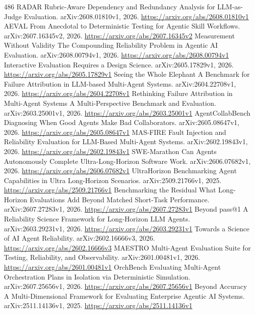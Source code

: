 \documentclass[11pt]{article}
\begin{document}
\begin{thebibliography}{486}
 RADAR Rubric-Aware Dependency and Redundancy Analysis for LLM-as-Judge Evaluation. arXiv:2608.01810v1, 2026. \url{https://arxiv.org/abs/2608.01810v1}
 AEVAL From Anecdotal to Deterministic Testing for Agentic Skill Workflows. arXiv:2607.16345v2, 2026. \url{https://arxiv.org/abs/2607.16345v2}
 Measurement Without Validity The Compounding Reliability Problem in Agentic AI Evaluation. arXiv:2608.00794v1, 2026. \url{https://arxiv.org/abs/2608.00794v1}
 Interactive Evaluation Requires a Design Science. arXiv:2605.17829v1, 2026. \url{https://arxiv.org/abs/2605.17829v1}
 Seeing the Whole Elephant A Benchmark for Failure Attribution in LLM-based Multi-Agent Systems. arXiv:2604.22708v1, 2026. \url{https://arxiv.org/abs/2604.22708v1}
 Rethinking Failure Attribution in Multi-Agent Systems A Multi-Perspective Benchmark and Evaluation. arXiv:2603.25001v1, 2026. \url{https://arxiv.org/abs/2603.25001v1}
 AgentCollabBench Diagnosing When Good Agents Make Bad Collaborators. arXiv:2605.08647v1, 2026. \url{https://arxiv.org/abs/2605.08647v1}
 MAS-FIRE Fault Injection and Reliability Evaluation for LLM-Based Multi-Agent Systems. arXiv:2602.19843v1, 2026. \url{https://arxiv.org/abs/2602.19843v1}
 SWE-Marathon Can Agents Autonomously Complete Ultra-Long-Horizon Software Work. arXiv:2606.07682v1, 2026. \url{https://arxiv.org/abs/2606.07682v1}
 UltraHorizon Benchmarking Agent Capabilities in Ultra Long-Horizon Scenarios. arXiv:2509.21766v1, 2025. \url{https://arxiv.org/abs/2509.21766v1}
 Benchmarking the Residual What Long-Horizon Evaluations Add Beyond Matched Short-Task Performance. arXiv:2607.27283v1, 2026. \url{https://arxiv.org/abs/2607.27283v1}
 Beyond pass@1 A Reliability Science Framework for Long-Horizon LLM Agents. arXiv:2603.29231v1, 2026. \url{https://arxiv.org/abs/2603.29231v1}
 Towards a Science of AI Agent Reliability. arXiv:2602.16666v3, 2026. \url{https://arxiv.org/abs/2602.16666v3}
 MAESTRO Multi-Agent Evaluation Suite for Testing, Reliability, and Observability. arXiv:2601.00481v1, 2026. \url{https://arxiv.org/abs/2601.00481v1}
 OrchBench Evaluating Multi-Agent Orchestration Plans in Isolation via Deterministic Simulation. arXiv:2607.25656v1, 2026. \url{https://arxiv.org/abs/2607.25656v1}
 Beyond Accuracy A Multi-Dimensional Framework for Evaluating Enterprise Agentic AI Systems. arXiv:2511.14136v1, 2025. \url{https://arxiv.org/abs/2511.14136v1}

\end{thebibliography}
\end{document}
